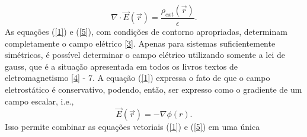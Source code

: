 \documentclass[brazilian,10pt,a4paper]{article}
\begin{document}
\begin{multicols}{2}
\begin{equation}\label{5}
\nabla\cdot\vec{E}(\vec{r})=\frac{\rho_{ext}(\vec{r})}{\epsilon} .
\end{equation}
As equações (\ref{1}) e (\ref{5}), com condições de contorno apropriadas, determinam completamente o campo elétrico \ref{3}.
Apenas para sistemas suficientemente simétricos, é possível determinar o campo elétrico utilizando somente a lei de gauss, que
é a situação apresentada em todos os livros textos de eletromagnetismo \ref{4} - 7. A equação (\ref{1}) %
expressa o fato de que o campo eletrostático é conservativo, podendo, então, ser expresso como o gradiente de um campo escalar, i.e.,
\begin{equation}\label{6}
\vec{E}(\vec{r})= -\nabla\phi(r) .
\end{equation}
	Isso permite combinar as equações vetoriais (\ref{1}) e (\ref{5}) em uma única
\end{multicols}
\end{document}
